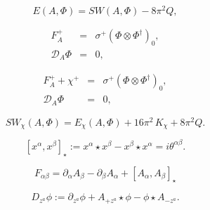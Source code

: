 \documentclass[]{article}
\begin{document}
		

		
		\begin{equation}\label{swaB1}
			E(A,\Phi)=SW(A,\Phi)-8\pi^2 Q,
		\end{equation}
		


		

		
		\begin{eqnarray}
			F^+_A &=& \sigma^+(\Phi\otimes\Phi^\dagger)_0,\\
			\mathcal{D}_A\Phi &=&0,
		\end{eqnarray}
		


		
		\begin{eqnarray}
			F^+_A+\chi^+ &=& \sigma^+(\Phi\otimes\Phi^\dagger)_0,\label{pe2}\\
			\mathcal{D}_A\Phi &=& 0,
		\end{eqnarray}
		



		
		\begin{equation}
			SW_\chi(A,\Phi)=E_\chi(A,\Phi)+16\pi^2\,K_\chi+8\pi^2 Q.
		\end{equation}

		

		

		
		\begin{equation}\label{cr1}
			[x^{\alpha},x^{\beta}]_{\star}:=
			x^{\alpha}\star x^{\beta}-x^{\beta}\star x^{\alpha}
			=i\theta^{\alpha\beta}.
		\end{equation}
		

		

		

		
		\begin{equation}
			F_{\alpha\beta}=\partial_\alpha A_\beta -\partial_\beta A_\alpha+
			[A_\alpha,A_\beta]_\star
		\end{equation}

		

		

		

		

		

		

	


		
		\begin{equation}\label{eq:cd}
			D_{z^a}\phi := \partial_{z^a}\phi+A_{+z^a}\star\phi-\phi\star
			A_{-z^a}.
		\end{equation}
		
\end{document}
